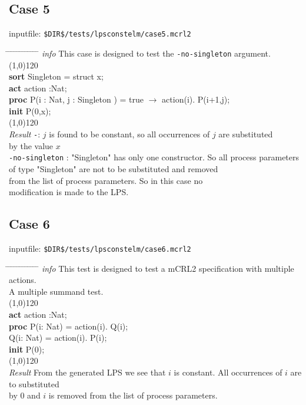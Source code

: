 \index{}\documentclass[a4paper,10pt]{article}
\theoremstyle{plain}
\theoremstyle{definition}
\newcommand{\pps}{process parameters}
\newcommand{\ti}{\textit}
\newcommand{\tb}{\textbf}
\newcommand{\tabw}{\hspace*{15.mm} \= \hspace*{20.mm} \= \hspace*{5.mm} \= \hspace*{5.mm} \= \hspace*{5.mm} \= \hspace*{5.mm}  \= \hspace*{5.mm}  \= \hspace*{5.mm}  \= \hspace*{5.mm} \= \hspace*{5.mm} \= \hspace*{5.mm}  \= \hspace*{5.mm}  \= \hspace*{5.mm}\kill}
\begin{document}
\subsection*{Case 5}
inputfile: \verb"$DIR$/tests/lpsconstelm/case5.mcrl2"
\begin{tabbing}
\tabw
\ti{info} \> This case is designed to test the \verb"-no-singleton" argument. \\
\line(1,0){120}\\
\tb{sort} \> Singleton = struct x; \\
\tb{act}  \> action :Nat; \\
\tb{proc} \>  P(i : Nat, j : Singleton ) = true $\rightarrow$ action(i). P(i+1,j); \\
\tb{init} \>  P(0,x); \\
\line(1,0){120}\\
\ti{Result} \> 
\verb"-": \> \> $j$ is found to be constant, so all occurrences of $j$ are substituted  \\
\> \> \> by the value $x$\\
\> \verb"-no-singleton" : \> \> "Singleton" has only one constructor. So all \pps\  \\
\> \> \>                       of type "Singleton" are not to be substituted and removed  \\
\> \> \>                       from the list of \pps . So in this case no  \\
\> \> \>                       modification is made to the LPS.
\end{tabbing}
\newpage
\subsection*{Case 6}
inputfile: \verb"$DIR$/tests/lpsconstelm/case6.mcrl2"
\begin{tabbing}
\tabw
\ti{info} \> This test is designed to test a mCRL2 specification with multiple actions. \\
          \> A multiple summand test. \\
\line(1,0){120}\\
\tb{act} \> action :Nat;\\
\tb{proc} \> P(i: Nat) = \>  action(i). Q(i);\\
     \> Q(i: Nat) = \>  action(i). P(i);\\

\tb{init} \> P(0);\\
\line(1,0){120}\\
\ti{Result} \> From the generated LPS we see that $i$ is constant. All occurrences of $i$ are to substituted \\
 \> by 0 and $i$ is removed from the list of \pps .
\end{tabbing}
\end{document}
